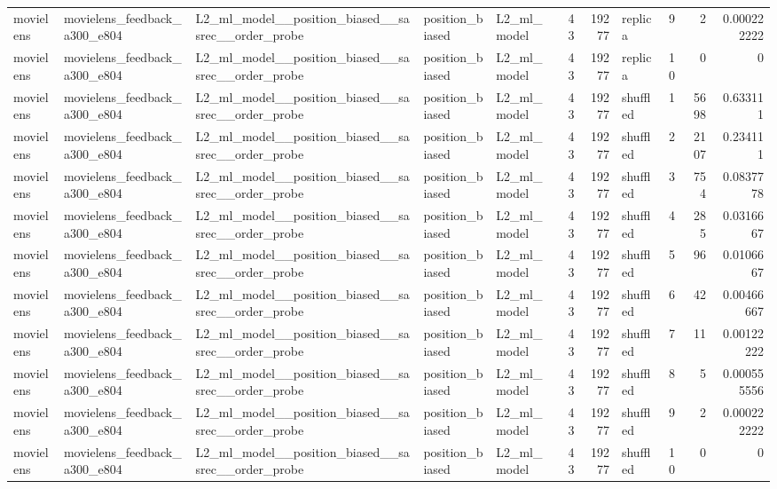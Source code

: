 \begin{table}[htbp!]
\begin{tabular}{lllllrrlrrr}
movielens & movielens\_feedback\_a300\_e804 & L2\_ml\_model\_\_position\_biased\_\_sasrec\_\_order\_probe & position\_biased & L2\_ml\_model & 43 & 19277 & replica & 9 & 2 & 0.000222222 \\
movielens & movielens\_feedback\_a300\_e804 & L2\_ml\_model\_\_position\_biased\_\_sasrec\_\_order\_probe & position\_biased & L2\_ml\_model & 43 & 19277 & replica & 10 & 0 & 0 \\
movielens & movielens\_feedback\_a300\_e804 & L2\_ml\_model\_\_position\_biased\_\_sasrec\_\_order\_probe & position\_biased & L2\_ml\_model & 43 & 19277 & shuffled & 1 & 5698 & 0.633111 \\
movielens & movielens\_feedback\_a300\_e804 & L2\_ml\_model\_\_position\_biased\_\_sasrec\_\_order\_probe & position\_biased & L2\_ml\_model & 43 & 19277 & shuffled & 2 & 2107 & 0.234111 \\
movielens & movielens\_feedback\_a300\_e804 & L2\_ml\_model\_\_position\_biased\_\_sasrec\_\_order\_probe & position\_biased & L2\_ml\_model & 43 & 19277 & shuffled & 3 & 754 & 0.0837778 \\
movielens & movielens\_feedback\_a300\_e804 & L2\_ml\_model\_\_position\_biased\_\_sasrec\_\_order\_probe & position\_biased & L2\_ml\_model & 43 & 19277 & shuffled & 4 & 285 & 0.0316667 \\
movielens & movielens\_feedback\_a300\_e804 & L2\_ml\_model\_\_position\_biased\_\_sasrec\_\_order\_probe & position\_biased & L2\_ml\_model & 43 & 19277 & shuffled & 5 & 96 & 0.0106667 \\
movielens & movielens\_feedback\_a300\_e804 & L2\_ml\_model\_\_position\_biased\_\_sasrec\_\_order\_probe & position\_biased & L2\_ml\_model & 43 & 19277 & shuffled & 6 & 42 & 0.00466667 \\
movielens & movielens\_feedback\_a300\_e804 & L2\_ml\_model\_\_position\_biased\_\_sasrec\_\_order\_probe & position\_biased & L2\_ml\_model & 43 & 19277 & shuffled & 7 & 11 & 0.00122222 \\
movielens & movielens\_feedback\_a300\_e804 & L2\_ml\_model\_\_position\_biased\_\_sasrec\_\_order\_probe & position\_biased & L2\_ml\_model & 43 & 19277 & shuffled & 8 & 5 & 0.000555556 \\
movielens & movielens\_feedback\_a300\_e804 & L2\_ml\_model\_\_position\_biased\_\_sasrec\_\_order\_probe & position\_biased & L2\_ml\_model & 43 & 19277 & shuffled & 9 & 2 & 0.000222222 \\
movielens & movielens\_feedback\_a300\_e804 & L2\_ml\_model\_\_position\_biased\_\_sasrec\_\_order\_probe & position\_biased & L2\_ml\_model & 43 & 19277 & shuffled & 10 & 0 & 0 \\

\end{tabular}
\end{table}
